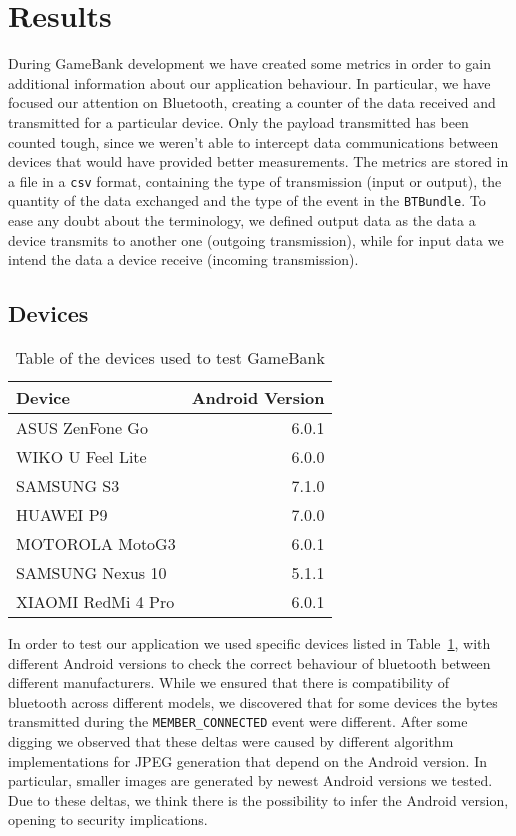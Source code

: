 \section{Results}

During GameBank development we have created some metrics in order to gain 
additional information about our application behaviour. In particular, we 
have focused our attention on Bluetooth, creating a counter of the data 
received and transmitted for a particular device. Only the payload transmitted 
has been counted tough, since we weren't able to intercept data communications 
between devices that would have provided better measurements. The metrics are 
stored in a file in a \texttt{csv} format, containing the type of transmission 
(input or output), the quantity of the data exchanged and the type of the 
event in the \texttt{BTBundle}. To ease any doubt about the terminology, we 
defined output data as the data a device transmits to another one (outgoing 
transmission), while for input data we intend the data a device receive 
(incoming transmission).

\subsection{Devices}

\begin{table}[t]
 \centering
 \caption{Table of the devices used to test GameBank}
 \label{tab:res:lod}
 \begin{tabular}{l r}
  \textbf{Device} & \textbf{Android Version} \\ \toprule
  ASUS ZenFone Go & 6.0.1 \\
  WIKO U Feel Lite & 6.0.0 \\
  SAMSUNG S3 & 7.1.0 \\
  HUAWEI P9 & 7.0.0 \\
  MOTOROLA MotoG3 & 6.0.1 \\
  SAMSUNG Nexus 10 & 5.1.1 \\
  XIAOMI RedMi 4 Pro & 6.0.1
 \end{tabular}
\end{table}

In order to test our application we used specific devices listed in 
Table~\ref{tab:res:lod}, with different Android versions to check the correct 
behaviour of bluetooth between different manufacturers. While we ensured that 
there is compatibility of bluetooth across different models, we discovered that 
for some devices the bytes transmitted during the \texttt{MEMBER\_CONNECTED} 
event were different. After some digging we observed that these deltas were 
caused by different algorithm implementations for JPEG generation that depend
on the Android version. In particular, smaller images are generated 
by newest Android versions we tested. Due to these deltas, we think there is the 
possibility to infer the Android version, opening to security implications.

